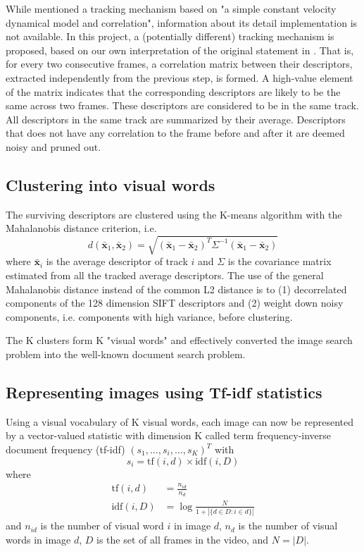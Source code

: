 \documentclass[conference]{IEEEtran}
\begin{document}
While \cite{sivic2003video} mentioned a tracking mechanism based on "a simple constant velocity dynamical model and correlation", 
information about its detail implementation is not available. In this project, a (potentially different) tracking mechanism is proposed, based on our own 
interpretation of the original statement in \cite{sivic2003video}. That is, for every two consecutive frames, a correlation matrix between 
their descriptors, extracted independently from the previous step, is formed. 
A high-value element of the matrix 
indicates that the corresponding descriptors are likely to be the same across two frames. These descriptors are considered to be in the same track. 
All descriptors in the same track are summarized by their average. Descriptors that does not 
have any correlation to the frame before and after it are deemed noisy and pruned out.

\subsection{Clustering into visual words}
The surviving descriptors are clustered using the K-means algorithm with the Mahalanobis distance criterion, i.e.
$$
d(\bar{\mathbf{x}}_1, \bar{\mathbf{x}}_2) = \sqrt{(\bar{\mathbf{x}}_1  - \bar{\mathbf{x}}_2)^T\Sigma^{-1}
(\bar{\mathbf{x}}_1  - \bar{\mathbf{x}}_2)}
$$
where $\bar{\mathbf{x}}_i$ is the average descriptor of track $i$ and $\Sigma$ is the covariance matrix estimated from 
all the tracked  average descriptors. The use of the general Mahalanobis distance instead of the common L2 distance is to (1) decorrelated
components of the 128 dimension SIFT descriptors and (2) weight down noisy components, i.e. components with high variance, before clustering.


The K clusters form K "visual words" and effectively converted the image search problem into the well-known document search problem.

\subsection{Representing images using Tf-idf statistics}
Using a visual vocabulary of K visual words, each image can now be represented by a vector-valued statistic with dimension K called term 
frequency-inverse document frequency (tf-idf) \cite{salton1983introduction, salton1988term} $(s_1, \dots, s_i, \dots, s_K)^T$ with
$$
s_i = \text{tf}(i, d) \times \text{idf}(i, D)
$$
where 
$$
\begin{aligned}
\text{tf}(i, d) &= \frac{n_{id}}{n_d}\\
\text{idf}(i, D) &= \log\frac{N}{1+|\{d\in D: i\in d\}|}
\end{aligned}
$$
and $n_{id}$ is the number of visual word $i$ in image $d$, $n_d$ is the number of visual words in image $d$, $D$ is the set of all frames
in the video, and $N = |D|$.
\end{document}
